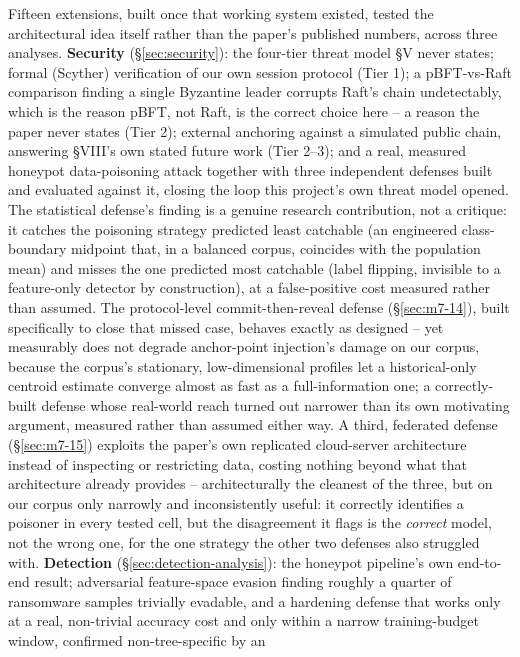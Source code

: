 \documentclass[conference]{IEEEtran}
\begin{document}
Fifteen extensions, built once that working system existed, tested the architectural idea itself
rather than the paper's published numbers, across three analyses. \textbf{Security}
(\S\ref{sec:security}): the four-tier threat model \S V never states; formal (Scyther)
verification of our own session protocol (Tier 1); a pBFT-vs-Raft comparison finding a single
Byzantine leader corrupts Raft's chain undetectably, which is the reason pBFT, not Raft, is the
correct choice here -- a reason the paper never states (Tier 2); external anchoring against a
simulated public chain, answering \S VIII's own stated future work (Tier 2--3); and a real,
measured honeypot data-poisoning attack together with three independent defenses built and
evaluated against it, closing the loop this project's own threat model opened. The statistical
defense's finding is a genuine research contribution, not a critique: it catches the poisoning
strategy predicted least catchable (an engineered class-boundary midpoint that, in a balanced
corpus, coincides with the population mean) and misses the one predicted most catchable (label
flipping, invisible to a feature-only detector by construction), at a false-positive cost measured
rather than assumed. The protocol-level commit-then-reveal defense (\S\ref{sec:m7-14}), built
specifically to close that missed case, behaves exactly as designed -- yet measurably does not
degrade anchor-point injection's damage on our corpus, because the corpus's stationary,
low-dimensional profiles let a historical-only centroid estimate converge almost as fast as a
full-information one; a correctly-built defense whose real-world reach turned out narrower than
its own motivating argument, measured rather than assumed either way. A third, federated defense
(\S\ref{sec:m7-15}) exploits the paper's own replicated cloud-server architecture instead of
inspecting or restricting data, costing nothing beyond what that architecture already provides --
architecturally the cleanest of the three, but on our corpus only narrowly and inconsistently
useful: it correctly identifies a poisoner in every tested cell, but the disagreement it flags is
the \emph{correct} model, not the wrong one, for the one strategy the other two defenses also
struggled with. \textbf{Detection}
(\S\ref{sec:detection-analysis}): the honeypot pipeline's own
end-to-end result; adversarial feature-space evasion finding roughly a quarter of ransomware
samples trivially evadable, and a hardening defense that works only at a real, non-trivial
accuracy cost and only within a narrow training-budget window, confirmed non-tree-specific by an
\end{document}

